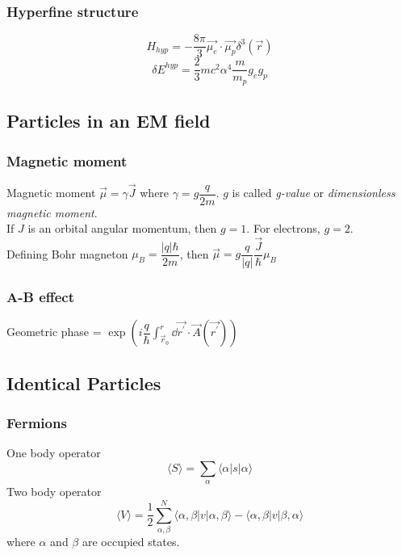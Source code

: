 \documentclass{article}
\newcommand{\ket}[1]{|#1\rangle}
\newcommand{\bra}[1]{\langle #1|}
\begin{document}
\subsubsection{Hyperfine structure}
\begin{equation}
H_{hyp}=-\frac{8\pi}{3}\vec{\mu_e}\cdot\vec{\mu_p}\delta^3(\vec{r})
\end{equation}
\begin{equation}
\delta E^{hyp}=\frac{2}{3}mc^2\alpha^4\frac{m}{m_p}g_eg_p
\end{equation}

\subsection{Particles in an EM field}
\subsubsection{Magnetic moment}
Magnetic moment $\vec\mu = \gamma\vec J$ where $\gamma = g \dfrac{q}{2m}$. $g$ is called \textit{g-value} or \textit{dimensionless magnetic moment}.\\
If $J$ is an orbital angular momentum, then $g=1$. For electrons, $g=2$.\\
Defining Bohr magneton $\mu_B = \dfrac{|q|\hbar}{2m}$, then $\vec\mu=g\dfrac{q}{|q|}\dfrac{\vec J}{\hbar}\mu_B $
\subsubsection{A-B effect}
Geometric phase = $\exp(i\dfrac{q}{\hbar}\displaystyle\int_{\vec r_0}^{r}\dd\vec{r^\prime}\cdot\vec A(\vec {r^\prime}))$

\subsection{Identical Particles}
\subsubsection{Fermions}
One body operator
\begin{equation}
\langle S \rangle = \sum_{\alpha}\bra{\alpha}s\ket{\alpha}
\end{equation}
Two body operator
\begin{equation}
\langle V \rangle = 
\frac{1}{2}\sum_{\alpha, \beta}^{N}\bra{\alpha,\beta}v\ket{\alpha,\beta}-\bra{\alpha, \beta}v\ket{\beta,\alpha}
\end{equation}
where $\alpha$ and $\beta$ are occupied states.
\end{document}
